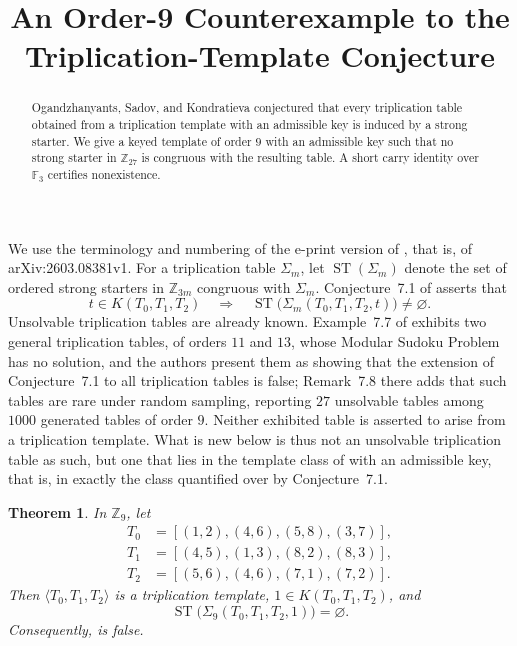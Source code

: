 \documentclass[11pt]{amsart}
\title[An order-9 counterexample]
{An Order-9 Counterexample to the Triplication-Template Conjecture}
\date{}
\newtheorem{theorem}{Theorem}
\theoremstyle{remark}
\newcommand{\Z}{\mathbb Z}
\newcommand{\F}{\mathbb F}
\newcommand{\ST}{\operatorname{ST}}
\begin{document}
\begin{abstract}
Ogandzhanyants, Sadov, and Kondratieva conjectured that every
triplication table obtained from a triplication template with an admissible
key is induced by a strong starter. We give a keyed template of order $9$
with an admissible key such that no strong starter in $\Z_{27}$ is congruous
with the resulting table. A short carry identity over $\F_3$ certifies
nonexistence.
\end{abstract}

\maketitle

We use the terminology and numbering of the e-print version of \cite{OSK},
that is, of arXiv:2603.08381v1. For a triplication table $\Sigma_m$, let
$\ST(\Sigma_m)$ denote the set of ordered strong starters in $\Z_{3m}$
congruous with $\Sigma_m$.
Conjecture~7.1 of \cite{OSK} asserts that
\[
 t\in K(T_0,T_1,T_2)
 \quad\Longrightarrow\quad
 \ST\bigl(\Sigma_m(T_0,T_1,T_2,t)\bigr)\ne\varnothing.
\]
Unsolvable triplication tables are already known. Example~7.7 of \cite{OSK}
exhibits two general triplication tables, of orders $11$ and $13$, whose
Modular Sudoku Problem has no solution, and the authors present them as
showing that the extension of Conjecture~7.1 to all triplication tables is
false; Remark~7.8 there adds that such tables are rare under random
sampling, reporting $27$ unsolvable tables among $1000$ generated tables of
order $9$. Neither exhibited table is asserted to arise from a triplication
template. What is new below is thus not an unsolvable triplication table as
such, but one that lies in the template class of \cite[Definition~4.2]{OSK}
with an admissible key, that is, in exactly the class quantified over by
Conjecture~7.1.

\begin{theorem}\label{thm:main}
In $\Z_9$, let
\[
\begin{aligned}
T_0&=[(1,2),(4,6),(5,8),(3,7)],\\
T_1&=[(4,5),(1,3),(8,2),(8,3)],\\
T_2&=[(5,6),(4,6),(7,1),(7,2)].
\end{aligned}
\]
Then $\langle T_0,T_1,T_2\rangle$ is a triplication template,
$1\in K(T_0,T_1,T_2)$, and
\[
\ST\bigl(\Sigma_9(T_0,T_1,T_2,1)\bigr)=\varnothing.
\]
Consequently, \cite[Conjecture~7.1]{OSK} is false.
\end{theorem}
\end{document}
